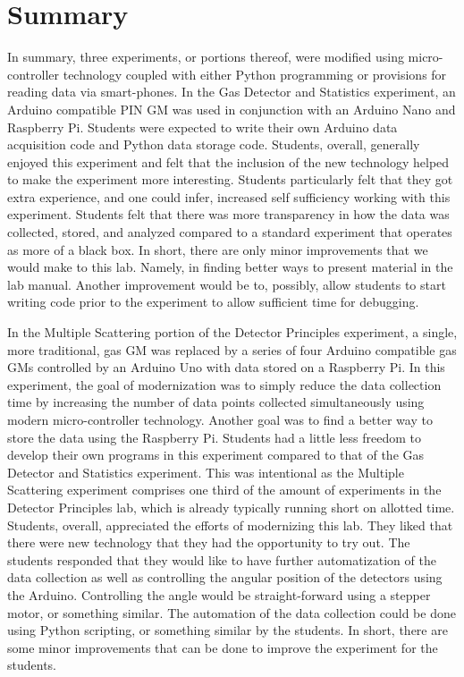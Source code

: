\section{Summary}
In summary, three experiments, or portions thereof, were modified using micro-controller technology coupled with either Python programming or provisions for reading data via smart-phones.
In the Gas Detector and Statistics experiment, an Arduino compatible PIN GM was used in conjunction with an Arduino Nano and Raspberry Pi.
Students were expected to write their own Arduino data acquisition code and Python data storage code.
Students, overall, generally enjoyed this experiment and felt that the inclusion of the new technology helped to make the experiment more interesting.
Students particularly felt that they got extra experience, and one could infer, increased self sufficiency working with this experiment.
Students felt that there was more transparency in how the data was collected, stored, and analyzed compared to a standard experiment that operates as more of a black box.
In short, there are only minor improvements that we would make to this lab.
Namely, in finding better ways to present material in the lab manual.
Another improvement would be to, possibly, allow students to start writing code prior to the experiment to allow sufficient time for debugging.

In the Multiple Scattering portion of the Detector Principles experiment, a single, more traditional, gas GM was replaced by a series of four Arduino compatible gas GMs controlled by an Arduino Uno with data stored on a Raspberry Pi.
In this experiment, the goal of modernization was to simply reduce the data collection time by increasing the number of data points collected simultaneously using modern micro-controller technology.
Another goal was to find a better way to store the data using the Raspberry Pi.
Students had a little less freedom to develop their own programs in this experiment compared to that of the Gas Detector and Statistics experiment.
This was intentional as the Multiple Scattering experiment comprises one third of the amount of experiments in the Detector Principles lab, which is already typically running short on allotted time.
Students, overall, appreciated the efforts of modernizing this lab.
They liked that there were new technology that they had the opportunity to try out.
The students responded that they would like to have further automatization of the data collection as well as controlling the angular position of the detectors using the Arduino.
Controlling the angle would be straight-forward using a stepper motor, or something similar.
The automation of the data collection could be done using Python scripting, or something similar by the students.
In short, there are some minor improvements that can be done to improve the experiment for the students.

